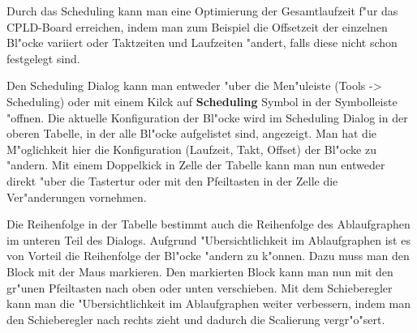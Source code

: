 \documentclass[a4paper,titlepage,12pt,ngerman]{scrbook}
\begin{document}
Durch das Scheduling kann man eine Optimierung der Gesamtlaufzeit f"ur das CPLD-Board erreichen, indem man zum Beispiel die Offsetzeit der einzelnen Bl"ocke variiert oder Taktzeiten und Laufzeiten "andert, falls diese nicht schon festgelegt sind.\par
Den Scheduling Dialog kann man entweder "uber die Men"uleiste (Tools -> Scheduling) oder mit einem Kilck auf {\bf Scheduling} Symbol in der Symbolleiste "offnen.
Die aktuelle Konfiguration der Bl"ocke wird im Scheduling Dialog in der oberen Tabelle, in der alle Bl"ocke aufgelistet sind, angezeigt. Man hat die M"oglichkeit hier die Konfiguration (Laufzeit, Takt, Offset) der Bl"ocke zu "andern. Mit einem Doppelkick in Zelle der Tabelle kann man nun entweder direkt "uber die Tastertur oder mit den Pfeiltasten in der Zelle die Ver"anderungen vornehmen.\par
Die Reihenfolge in der Tabelle bestimmt auch die Reihenfolge des Ablaufgraphen im unteren Teil des Dialogs. Aufgrund "Ubersichtlichkeit im Ablaufgraphen ist es von Vorteil die Reihenfolge der Bl"ocke "andern zu k"onnen. Dazu muss man den Block mit der Maus markieren. Den markierten Block kann man nun mit den gr"unen Pfeiltasten nach oben oder unten verschieben. Mit dem Schieberegler kann man die "Ubersichtlichkeit im Ablaufgraphen weiter verbessern, indem man den Schieberegler nach rechts zieht und dadurch die Scalierung vergr"o"sert.\par
\end{document}
